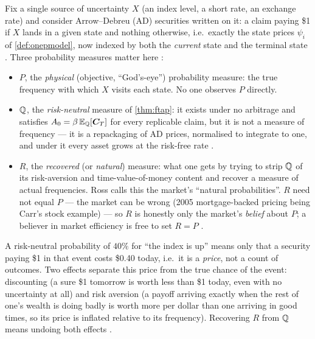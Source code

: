\begin{paracol}{2}
Fix a single source of uncertainty $X$ (an index level, a short rate, an exchange rate) and consider
Arrow--Debreu (AD) securities written on it: a claim paying \$1 if $X$ lands in a given state and nothing
otherwise, i.e.\ exactly the state prices $\psi_i$ of \cref{def:onepmodel}, now indexed by both the
\emph{current} state and the terminal state . Three probability measures matter here
:
\begin{itemize}
  \item $P$, the \emph{physical} (objective, ``God's-eye'') probability measure: the true frequency with
        which $X$ visits each state. No one observes $P$ directly.
  \item $\mathbb{Q}$, the \emph{risk-neutral} measure of \cref{thm:ftap}: it exists under no arbitrage and
        satisfies $A_0=\beta\,\mathbb{E}_{\mathbb{Q}}[\bm C_T]$ for every replicable claim, but it is not a measure of frequency
        --- it is a repackaging of AD prices, normalised to integrate to one, and under it every asset grows
        at the risk-free rate .
  \item $R$, the \emph{recovered} (or \emph{natural}) measure: what one gets by trying to strip $\mathbb{Q}$ of its
        risk-aversion and time-value-of-money content and recover a measure of actual frequencies. Ross
        calls this the market's ``natural probabilities''. $R$ need not equal $P$ --- the market can be
        wrong (2005 mortgage-backed pricing being Carr's stock example) --- so $R$ is honestly only the
        market's \emph{belief} about $P$; a believer in market efficiency is free to set $R=P$
        .
\end{itemize}

\begin{intuition}
A risk-neutral probability of $40\%$ for ``the index is up'' means only that a security paying \$1 in that
event costs \$0.40 today, i.e.\ it is a \emph{price}, not a count of outcomes. Two effects separate this
price from the true chance of the event: discounting (a sure \$1 tomorrow is worth less than \$1 today,
even with no uncertainty at all) and risk aversion (a payoff arriving exactly when the rest of one's wealth
is doing badly is worth more per dollar than one arriving in good times, so its price is inflated relative
to its frequency). Recovering $R$ from $\mathbb{Q}$ means undoing both effects .
\end{intuition}


\end{paracol}
